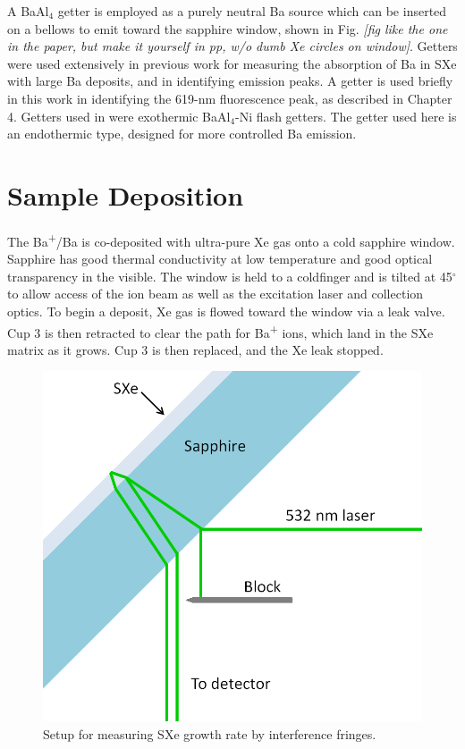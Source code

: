 A BaAl$_{4}$ getter is employed as a purely neutral Ba source which can be inserted on a bellows to emit toward the sapphire window, shown in Fig. \emph{\color{red}[fig like the one in the paper, but make it yourself in pp, w/o dumb Xe circles on window]}.  Getters were used extensively in previous work \cite{Brian} for measuring the absorption of Ba in SXe with large Ba deposits, and in identifying emission peaks.  A getter is used briefly in this work in identifying the 619-nm fluorescence peak, as described in Chapter 4.  Getters used in \cite{Brian} were exothermic BaAl$_{4}$-Ni flash getters.  The getter used here is an endothermic type, designed for more controlled Ba emission.  

\section{Sample Deposition}

The Ba\textsuperscript{+}/Ba is co-deposited with ultra-pure Xe gas onto a cold sapphire window.  Sapphire has good thermal conductivity at low temperature and good optical transparency in the visible.  The window is held to a coldfinger and is tilted at 45$^{\circ}$ to allow access of the ion beam as well as the excitation laser and collection optics.  To begin a deposit, Xe gas is flowed toward the window via a leak valve.  Cup 3 is then retracted to clear the path for Ba\textsuperscript{+} ions, which land in the SXe matrix as it grows.  Cup 3 is then replaced, and the Xe leak stopped.

\begin{figure} %
        \centering
                \includegraphics[width=.4\textwidth]{figures/fringe_setup.png}
                \caption{Setup for measuring SXe growth rate by interference fringes.}
\label{fig:fringe_setup}
\end{figure}

